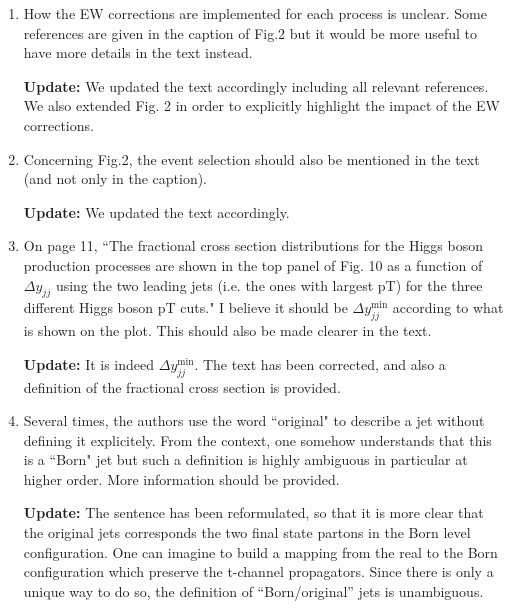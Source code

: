 \documentclass[12pt]{article}
\begin{document}
\begin{enumerate}
{\bf Update:} JH: I modified the wording of the footnote somewhat and added references for the ATLAS and CMS discovery papers for ttH. 

\item How the EW corrections are implemented for each process is unclear. Some references are given in the caption of Fig.2 but it would be more useful to have more details in the text instead.

{\bf Update:} We updated the text accordingly including all relevant references. We also extended Fig. 2 in order to explicitly highlight the impact of the EW corrections.

\item Concerning Fig.2, the event selection should also be mentioned in the text (and not only in the caption).

{\bf Update:} We updated the text accordingly.

\item On page 11, ``The fractional cross section distributions for the Higgs boson production processes are shown in the top panel of Fig. 10 as a function of $\Delta y_{jj}$ using the two leading jets (i.e. the ones with largest pT) for the three different Higgs boson pT cuts." I believe it should be $\Delta y_{jj}^{\text{min}}$ according to what is shown on the plot. This should also be made clearer in the text.

{\bf Update:} It is indeed $\Delta y_{jj}^{\text{min}}$. The text has been corrected, and also a definition of the fractional cross section is provided.

\item Several times, the authors use the word ``original" to describe a jet without defining it explicitely. From the context, one somehow understands that this is a ``Born" jet but such a definition is highly ambiguous in particular at higher order. More information should be provided.

{\bf Update:} The sentence has been reformulated, so that it is more clear that  the original jets corresponds the two final state partons in the Born level configuration. One can imagine to build a mapping from the real to the Born configuration which preserve the t-channel propagators. Since there is only a unique way to do so, the definition of ``Born/original'' jets is unambiguous.

\end{enumerate}
\end{document}
